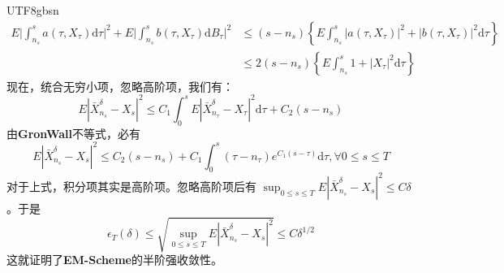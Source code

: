 \documentclass{article}
\begin{document}
\begin{CJK*}{UTF8}{gbsn}
$$\begin{aligned}
E\Bigg|\int_{n_{s}}^{s}a(\tau,X_{\tau})\mathrm{d}\tau\Bigg|^{2} +E\Bigg|\int_{n_{s}}^{s}b(\tau,X_{\tau})\mathrm{d}B_{\tau}\Bigg|^{2}
&\le(s-n_s)\left\{
E\int_{n_{s}}^{s}\left|a(\tau,X_{\tau})\right|^2+\left|b(\tau,X_{\tau})\right|^2\mathrm{d}\tau\right\}\\
&\le2(s-n_s)\left\{
E\int_{n_{s}}^{s}1+\left|X_{\tau}\right|^2\mathrm{d}\tau\right\}
\end{aligned}$$
现在，统合无穷小项，忽略高阶项，我们有：
$$
E\left|\bar{X}_{n_{s}}^{\delta}-X_{s}\right|^{2}
\le
C_1\int_0^sE\left|\bar{X}_{n_\tau}^{\delta}-X_{\tau}\right|^2\mathrm{d}\tau
+C_2(s-n_s)
$$
由\textbf{GronWall}不等式，必有
$$
E\left|\bar{X}_{n_{s}}^{\delta}-X_{s}\right|^{2}
\le
C_2(s-n_s)
+
C_1\int_0^s
(\tau-n_\tau)e^{C_1(s-\tau)}
\mathrm{d}\tau
,\forall 0\le s\le T
$$
对于上式，积分项其实是高阶项。忽略高阶项后有
$\sup_{0\le s\le T} E\left|\bar{X}_{n_{s}}^{\delta}-X_{s}\right|^{2}\le C\delta$。于是
$$
\epsilon_{T}(\delta)
\le
\sqrt{\sup_{0\le s\le T} E\left|\bar{X}_{n_{s}}^{\delta}-X_{s}\right|^{2}}\le C\delta^{1/2}
$$
这就证明了\textbf{EM-Scheme}的半阶强收敛性。


\end{CJK*}
\end{document}
